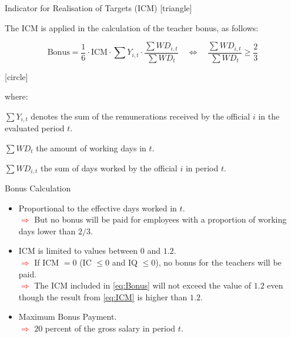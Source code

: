 \documentclass{beamer}
\begin{document}
\begin{frame}[label=BonusCalculation]{Indicator for Realisation of Targets (ICM)}
\vspace{-31pt} \flushright \hyperlink{Main1}{\beamerbutton{\textcolor{red}{Back}}} 
\vspace{20pt}
[triangle]
\begin{itemize} 
{\scriptsize\item The ICM is applied in the calculation of the teacher bonus, as follows:}
\end{itemize}

\vspace{-10pt}
\begin{equation} \label{eq:Bonus}
\text{Bonus} = \frac{1}{6} \cdot \text{ICM} \cdot \sum Y_{i,t} \cdot \frac{\sum WD_{i,t}}{\sum WD_{t}} \quad \iff \quad \frac{\sum WD_{i,t}}{\sum WD_{t}} \geq \frac{2}{3}
\end{equation}


\vspace{-5pt}
[circle]
\begin{flushleft} \hspace{9pt}
{\scriptsize where:}
\end{flushleft}
\vspace{-8pt}
\begin{itemize}
{\tiny\item $\sum Y_{i,t}$ denotes the sum of the remunerations received by the official $i$ in the evaluated period $t$.}
{\tiny\item $\sum WD_{t}$ the amount of working days in $t$.}
\vspace{-3pt}
{\tiny\item $\sum WD_{i,t}$ the sum of days worked by the official $i$ in period $t$.}
\end{itemize}

\begin{block}{\centering Bonus Calculation}
\begin{itemize}
\item [\sbt] \scriptsize Proportional to the effective days worked in $t$. 
\\ \tiny\textcolor{red}{$\Longrightarrow$} But no bonus will be paid for employees with a proportion of working days lower than $2/3$.
\item [\sbt] \scriptsize ICM is limited to values between $0$ and $1.2$. 
\\ \tiny\textcolor{red}{$\Longrightarrow$} If ICM $=0$ (IC $\leq 0$ and IQ $\leq 0$), no bonus for the teachers will be paid.
\\ \tiny\textcolor{red}{$\Longrightarrow$} The ICM included in \eqref{eq:Bonus} will not exceed the value of $1.2$ even though the result from \eqref{eq:ICM} is higher than $1.2$.
\item [\sbt] \scriptsize Maximum Bonus Payment.
\\ \tiny\textcolor{red}{$\Longrightarrow$} $20$ percent of the gross salary in period $t$. 
\end{itemize}
\end{block}
\end{frame}
\end{document}
